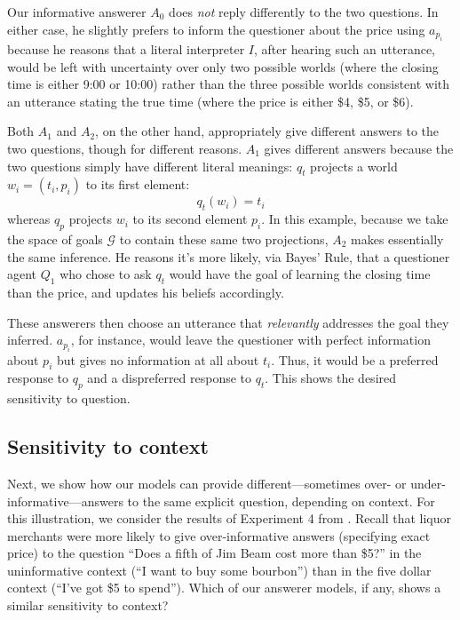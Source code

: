 \documentclass[11pt, floatsintext]{apa6}
\begin{document}
Our informative answerer $A_0$ does \emph{not} reply differently to the two questions. In either case, he slightly prefers to inform the questioner about the price using $a_{p_i}$ because he reasons that a literal interpreter $I$, after hearing such an utterance, would be left with uncertainty over only two possible worlds (where the closing time is either 9:00 or 10:00) rather than the three possible worlds consistent with an utterance stating the true time (where the price is either \$4, \$5, or \$6).

Both $A_1$ and $A_2$, on the other hand, appropriately give different answers to the two questions, though for different reasons. $A_1$ gives different answers because the two questions simply have different literal meanings: $q_t$ projects a world $w_i = (t_i, p_i)$ to its first element:$$q_t(w_i) = t_i$$ whereas $q_p$ projects $w_i$ to its second element $p_i$. In this example, because we take the space of goals $\mathcal{G}$ to contain these same two projections, $A_2$ makes essentially the same inference. He reasons it's more likely, via Bayes' Rule, that a questioner agent $Q_1$ who chose to ask $q_t$ would have the goal of learning the closing time than the price, and updates his beliefs accordingly.

These answerers then choose an utterance that \emph{relevantly} addresses the goal they inferred. $a_{p_i}$, for instance, would leave the questioner with perfect information about $p_i$ but gives no information at all about $t_i$. Thus, it would be a preferred response to $q_p$ and a dispreferred response to $q_t$. This shows the desired sensitivity to question.

\subsection{Sensitivity to context}

Next, we show how our models can provide different---sometimes over- or under-informative---answers to the same explicit question, depending on context. For this illustration, we consider the results of Experiment 4 from . Recall that liquor merchants were more likely to give over-informative answers (specifying exact price) to the question ``Does a fifth of Jim Beam cost more than \$5?'' in the uninformative context (``I want to buy some bourbon'') than in the five dollar context (``I've got \$5 to spend''). Which of our answerer models, if any, shows a similar sensitivity to context?
\end{document}

